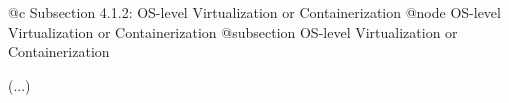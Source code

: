 @c Subsection 4.1.2: OS-level Virtualization or Containerization
@node OS-level Virtualization or Containerization
@subsection OS-level Virtualization or Containerization

(...)
